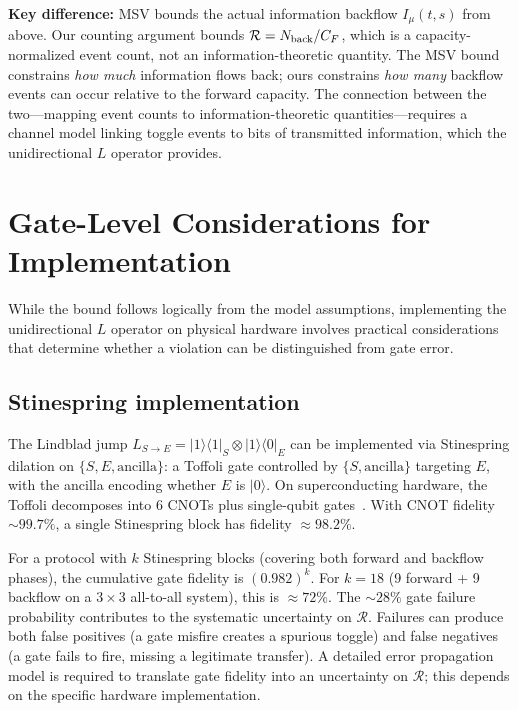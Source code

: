 \documentclass[aps,pra,onecolumn]{revtex4-2}
\begin{document}
\textbf{Key difference:} MSV bounds the actual information backflow $I_\mu(t,s)$ from above. Our counting argument bounds $\mathcal{R} = N_{\rm back}/C_F$, which is a capacity-normalized event count, not an information-theoretic quantity. The MSV bound constrains \textit{how much} information flows back; ours constrains \textit{how many} backflow events can occur relative to the forward capacity. The connection between the two---mapping event counts to information-theoretic quantities---requires a channel model linking toggle events to bits of transmitted information, which the unidirectional $L$ operator provides.

\section{Gate-Level Considerations for Implementation}

While the bound follows logically from the model assumptions, implementing the unidirectional $L$ operator on physical hardware involves practical considerations that determine whether a violation can be distinguished from gate error.

\subsection{Stinespring implementation}

The Lindblad jump $L_{S\to E} = |1\rangle\langle 1|_S \otimes |1\rangle\langle 0|_E$ can be implemented via Stinespring dilation on $\{S, E, \text{ancilla}\}$: a Toffoli gate controlled by $\{S, \text{ancilla}\}$ targeting $E$, with the ancilla encoding whether $E$ is $|0\rangle$. On superconducting hardware, the Toffoli decomposes into 6 CNOTs plus single-qubit gates~\cite{Shende:2009}. With CNOT fidelity $\sim 99.7\%$, a single Stinespring block has fidelity $\approx 98.2\%$.

For a protocol with $k$ Stinespring blocks (covering both forward and backflow phases), the cumulative gate fidelity is $(0.982)^k$. For $k=18$ (9 forward + 9 backflow on a $3 \times 3$ all-to-all system), this is $\approx 72\%$. The $\sim 28\%$ gate failure probability contributes to the systematic uncertainty on $\mathcal{R}$. Failures can produce both false positives (a gate misfire creates a spurious toggle) and false negatives (a gate fails to fire, missing a legitimate transfer). A detailed error propagation model is required to translate gate fidelity into an uncertainty on $\mathcal{R}$; this depends on the specific hardware implementation.
\end{document}
